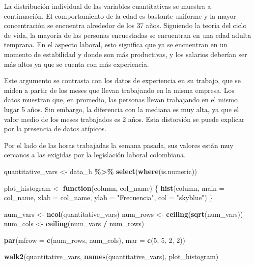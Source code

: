 \documentclass[
]{article}
\newenvironment{Shaded}{\begin{snugshade}}{\end{snugshade}}
\newcommand{\AttributeTok}[1]{\textcolor[rgb]{0.13,0.29,0.53}{#1}}
\newcommand{\ControlFlowTok}[1]{\textcolor[rgb]{0.13,0.29,0.53}{\textbf{#1}}}
\newcommand{\DecValTok}[1]{\textcolor[rgb]{0.00,0.00,0.81}{#1}}
\newcommand{\FunctionTok}[1]{\textcolor[rgb]{0.13,0.29,0.53}{\textbf{#1}}}
\newcommand{\NormalTok}[1]{#1}
\newcommand{\OtherTok}[1]{\textcolor[rgb]{0.56,0.35,0.01}{#1}}
\newcommand{\SpecialCharTok}[1]{\textcolor[rgb]{0.81,0.36,0.00}{\textbf{#1}}}
\newcommand{\StringTok}[1]{\textcolor[rgb]{0.31,0.60,0.02}{#1}}
\begin{document}
La distribución individual de las variables cuantitativas se muestra a
continuación. El comportamiento de la edad es bastante uniforme y la
mayor concentración se encuentra alrededor de los 37 años. Siguiendo la
teoría del ciclo de vida, la mayoría de las personas encuestadas se
encuentran en una edad adulta temprana. En el aspecto laboral, esto
significa que ya se encuentran en un momento de estabilidad y donde son
más productivas, y los salarios deberían ser más altos ya que se cuenta
con más experiencia.

Este argumento se contrasta con los datos de experiencia en su trabajo,
que se miden a partir de los meses que llevan trabajando en la misma
empresa. Los datos muestran que, en promedio, las personas llevan
trabajando en el mismo lugar 5 años. Sin embargo, la diferencia con la
mediana es muy alta, ya que el valor medio de los meses trabajados es 2
años. Esta distorsión se puede explicar por la presencia de datos
atípicos.

Por el lado de las horas trabajadas la semana pasada, sus valores están
muy cercanos a las exigidas por la legislación laboral colombiana.

\begin{Shaded}
\begin{Highlighting}[]
\NormalTok{quantitative\_vars }\OtherTok{\textless{}{-}}\NormalTok{ data\_h }\SpecialCharTok{\%\textgreater{}\%}
  \FunctionTok{select}\NormalTok{(}\FunctionTok{where}\NormalTok{(is.numeric))}

\NormalTok{plot\_histogram }\OtherTok{\textless{}{-}} \ControlFlowTok{function}\NormalTok{(column, col\_name) \{}
  \FunctionTok{hist}\NormalTok{(column, }\AttributeTok{main =}\NormalTok{ col\_name, }\AttributeTok{xlab =}\NormalTok{ col\_name, }\AttributeTok{ylab =} \StringTok{"Frecuencia"}\NormalTok{, }\AttributeTok{col =} \StringTok{"skyblue"}\NormalTok{)}
\NormalTok{\}}

\NormalTok{num\_vars }\OtherTok{\textless{}{-}} \FunctionTok{ncol}\NormalTok{(quantitative\_vars)}
\NormalTok{num\_rows }\OtherTok{\textless{}{-}} \FunctionTok{ceiling}\NormalTok{(}\FunctionTok{sqrt}\NormalTok{(num\_vars))}
\NormalTok{num\_cols }\OtherTok{\textless{}{-}} \FunctionTok{ceiling}\NormalTok{(num\_vars }\SpecialCharTok{/}\NormalTok{ num\_rows)}

\FunctionTok{par}\NormalTok{(}\AttributeTok{mfrow =} \FunctionTok{c}\NormalTok{(num\_rows, num\_cols), }\AttributeTok{mar =} \FunctionTok{c}\NormalTok{(}\DecValTok{5}\NormalTok{, }\DecValTok{5}\NormalTok{, }\DecValTok{2}\NormalTok{, }\DecValTok{2}\NormalTok{))  }

\FunctionTok{walk2}\NormalTok{(quantitative\_vars, }\FunctionTok{names}\NormalTok{(quantitative\_vars), plot\_histogram)}
\end{Highlighting}
\end{Shaded}
\end{document}
